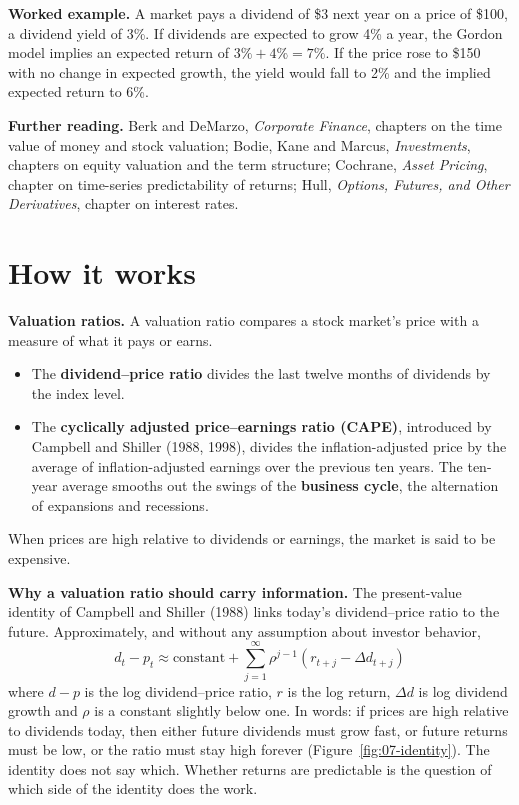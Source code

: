 \textbf{Worked example.} A market pays a dividend of \$3 next year on a price of \$100, a dividend yield of 3\%. If dividends are expected to grow 4\% a year, the Gordon model implies an expected return of $3\% + 4\% = 7\%$. If the price rose to \$150 with no change in expected growth, the yield would fall to 2\% and the implied expected return to 6\%.

\textbf{Further reading.} Berk and DeMarzo, \emph{Corporate Finance}, chapters on the time value of money and stock valuation; Bodie, Kane and Marcus, \emph{Investments}, chapters on equity valuation and the term structure; Cochrane, \emph{Asset Pricing}, chapter on time-series predictability of returns; Hull, \emph{Options, Futures, and Other Derivatives}, chapter on interest rates.

\section{How it works}
\label{sec:07-how}

\textbf{Valuation ratios.} A valuation ratio compares a stock market's price with a measure of what it pays or earns.

\begin{itemize}
  \item The \textbf{dividend--price ratio} divides the last twelve months of dividends by the index level.
  \item The \textbf{cyclically adjusted price--earnings ratio (CAPE)}, introduced by Campbell and Shiller (1988, 1998), divides the inflation-adjusted price by the average of inflation-adjusted earnings over the previous ten years. The ten-year average smooths out the swings of the \textbf{business cycle}, the alternation of expansions and recessions.
\end{itemize}

When prices are high relative to dividends or earnings, the market is said to be expensive.

\textbf{Why a valuation ratio should carry information.} The present-value identity of Campbell and Shiller (1988) links today's dividend--price ratio to the future. Approximately, and without any assumption about investor behavior,
\begin{equation}
  d_t - p_t \approx \text{constant} + \sum_{j=1}^{\infty} \rho^{j-1}\left(r_{t+j} - \Delta d_{t+j}\right)
  \label{eq:07-identity}
\end{equation}
where $d - p$ is the log dividend--price ratio, $r$ is the log return, $\Delta d$ is log dividend growth and $\rho$ is a constant slightly below one. In words: if prices are high relative to dividends today, then either future dividends must grow fast, or future returns must be low, or the ratio must stay high forever (Figure~\ref{fig:07-identity}). The identity does not say which. Whether returns are predictable is the question of which side of the identity does the work.


